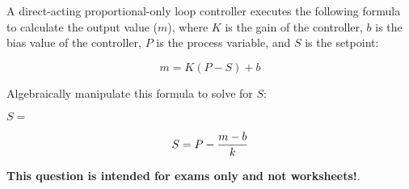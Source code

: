 

A direct-acting proportional-only loop controller executes the following formula to calculate the output value ($m$), where $K$ is the gain of the controller, $b$ is the bias value of the controller, $P$ is the process variable, and $S$ is the setpoint:

$$m = K(P - S) + b$$

Algebraically manipulate this formula to solve for $S$:

\vskip 20pt

$S = $







$$S = P - {m - b \over k}$$







{\bf This question is intended for exams only and not worksheets!}.



